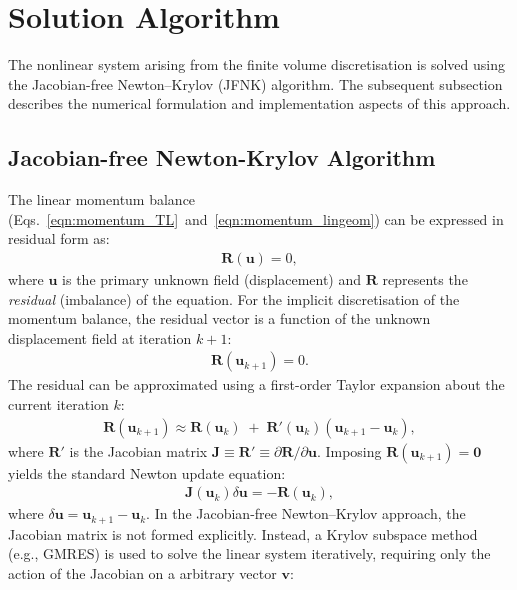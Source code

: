 \documentclass[review,3p]{elsarticle}
\newcommand{\bb}{\boldsymbol}
\begin{document}
\section{Solution Algorithm}
\label{sec:Sol_Alg}
%
%
The nonlinear system arising from the finite volume discretisation is solved using the Jacobian-free Newton–Krylov (JFNK) algorithm.
The subsequent subsection describes the numerical formulation and implementation aspects of this approach.
%
\subsection{Jacobian-free Newton-Krylov Algorithm}
\label{sec:JFNK_alg}
%
The linear momentum balance (Eqs.~\eqref{eqn:momentum_TL}~and~\eqref{eqn:momentum_lingeom}) can be expressed in residual form as:
%
\begin{eqnarray}
	\bb{R}(\bb{u}) = 0,
\end{eqnarray}
%
where $\bb{u}$ is the primary unknown field (displacement) and $\bb{R}$ represents the \emph{residual} (imbalance) of the equation.
For the implicit discretisation of the momentum balance, the residual vector is a function of the unknown displacement field at iteration $k+1$:
%
\begin{eqnarray}
	\bb{R}(\bb{u}_{k+1}) = 0.
\end{eqnarray}
%
The residual can be approximated using a first-order Taylor expansion about the current iteration $k$:
%
\begin{eqnarray}
	\bb{R}(\bb{u}_{k+1}) \approx \bb{R}(\bb{u}_{k}) \;+\;  \bb{R}'(\bb{u}_{k}) (\bb{u}_{k+1} - \bb{u}_{k}),
\end{eqnarray}
%
where $\bb{R}'$ is the Jacobian matrix $\bb{J}\equiv\bb{R}'\equiv\partial \bb{R} / \partial \bb{u}$.
Imposing $\bb{R}(\bb{u}_{k+1}) = \bb{0}$ yields the standard Newton update equation:
%
\begin{eqnarray}
	\bb{J}(\bb{u}_k) \delta \bb{u} = -\bb{R}(\bb{u}_k),
\end{eqnarray}
%
where $\delta \bb{u}=\bb{u}_{k+1} - \bb{u}_{k}$.
In the Jacobian-free Newton–Krylov approach, the Jacobian matrix is not formed explicitly.
Instead, a Krylov subspace method (e.g., GMRES) is used to solve the linear system iteratively, requiring only the action of the Jacobian on a arbitrary vector $\bb{v}$:
\end{document}
